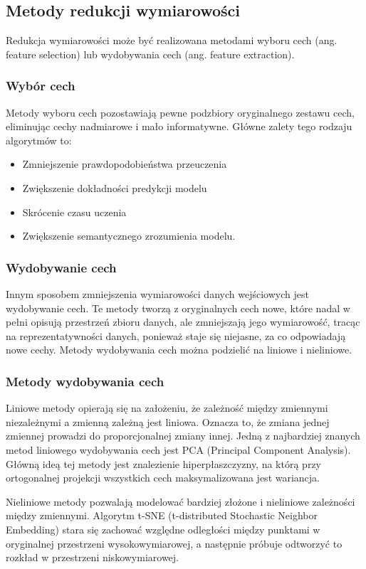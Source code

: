 	\subsection{Metody redukcji wymiarowości}
		Redukcja wymiarowości może być realizowana metodami wyboru cech (ang. feature selection) lub wydobywania cech (ang. feature extraction).
		
		
		\subsubsection{Wybór cech}
			Metody wyboru cech pozostawiają pewne podzbiory oryginalnego zestawu cech, eliminując cechy nadmiarowe i mało informatywne. Główne zalety tego rodzaju algorytmów to:
			\begin{itemize}
				\item Zmniejszenie prawdopodobieństwa przeuczenia
				\item Zwiększenie dokładności predykcji modelu
				\item Skrócenie czasu uczenia
				\item Zwiększenie semantycznego zrozumienia modelu.
			\end{itemize}
		
		\subsubsection{Wydobywanie cech}	
			Innym sposobem zmniejszenia wymiarowości danych wejściowych jest wydobywanie cech. Te metody tworzą z oryginalnych cech nowe, które nadal w pełni opisują przestrzeń zbioru danych, ale zmniejszają jego wymiarowość, tracąc na reprezentatywności danych, ponieważ staje się niejasne, za co odpowiadają nowe cechy. Metody wydobywania cech można podzielić na liniowe i nieliniowe.

		\subsubsection{Metody wydobywania cech}
			Liniowe metody opierają się na założeniu, że zależność między zmiennymi niezależnymi a zmienną zależną jest liniowa. Oznacza to, że zmiana jednej zmiennej prowadzi do proporcjonalnej zmiany innej. Jedną z najbardziej znanych metod liniowego wydobywania cech jest PCA (Principal Component Analysis). Główną ideą tej metody jest znalezienie hiperpłaszczyzny, na którą przy ortogonalnej projekcji wszystkich cech maksymalizowana jest wariancja.
		
			Nieliniowe metody pozwalają modelować bardziej złożone i nieliniowe zależności między zmiennymi. Algorytm t-SNE (t-distributed Stochastic Neighbor Embedding) stara się zachować względne odległości między punktami w oryginalnej przestrzeni wysokowymiarowej, a następnie próbuje odtworzyć to rozkład w przestrzeni niskowymiarowej.

